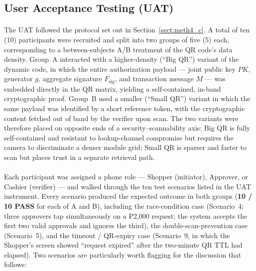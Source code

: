 \subsection{User Acceptance Testing (UAT)}
\label{sect:results_uat}

\paragraph{}The UAT followed the protocol set out in Section~\ref{sect:meth4_c}. A total of ten (10) participants were recruited and split into two groups of five (5) each, corresponding to a between-subjects A/B treatment of the QR code's data density. Group~A interacted with a higher-density (``Big QR'') variant of the dynamic code, in which the entire authorization payload --- joint public key $PK$, generator $g$, aggregate signature $F_{\text{sig}}$, and transaction message $M$ --- was embedded directly in the QR matrix, yielding a self-contained, in-band cryptographic proof. Group~B used a smaller (``Small QR'') variant in which the same payload was identified by a short reference token, with the cryptographic content fetched out of band by the verifier upon scan. The two variants were therefore placed on opposite ends of a security--scannability axis: Big QR is fully self-contained and resistant to lookup-channel compromise but requires the camera to discriminate a denser module grid; Small QR is sparser and faster to scan but places trust in a separate retrieval path.

\paragraph{}Each participant was assigned a phone role --- Shopper (initiator), Approver, or Cashier (verifier) --- and walked through the ten test scenarios listed in the UAT instrument. Every scenario produced the expected outcome in both groups (\textbf{10 / 10 PASS} for each of A and B), including the race-condition case (Scenario~4: three approvers tap simultaneously on a ₱2{,}000 request; the system accepts the first two valid approvals and ignores the third), the double-scan-prevention case (Scenario~5), and the timeout / QR-expiry case (Scenario~9, in which the Shopper's screen showed ``request expired'' after the two-minute QR TTL had elapsed). Two scenarios are particularly worth flagging for the discussion that follows:

